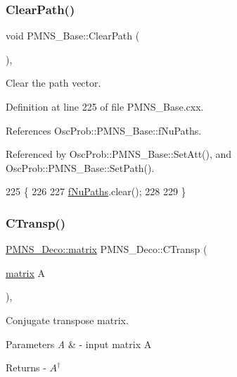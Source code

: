 \subsubsection{\texorpdfstring{Clear\+Path()}{ClearPath()}}
{\footnotesize\ttfamily void P\+M\+N\+S\+\_\+\+Base\+::\+Clear\+Path (\begin{DoxyParamCaption}{ }\end{DoxyParamCaption})\hspace{0.3cm}{\ttfamily [virtual]}, {\ttfamily [inherited]}}

Clear the path vector. 

Definition at line 225 of file P\+M\+N\+S\+\_\+\+Base.\+cxx.



References Osc\+Prob\+::\+P\+M\+N\+S\+\_\+\+Base\+::f\+Nu\+Paths.



Referenced by Osc\+Prob\+::\+P\+M\+N\+S\+\_\+\+Base\+::\+Set\+Att(), and Osc\+Prob\+::\+P\+M\+N\+S\+\_\+\+Base\+::\+Set\+Path().


\begin{DoxyCode}
225                          \{
226 
227   \hyperlink{classOscProb_1_1PMNS__Base_a69db9d57e12fc7cbe0431bc6c18fac93}{fNuPaths}.clear();
228 
229 \}
\end{DoxyCode}
\mbox{\label{classOscProb_1_1PMNS__Deco_aca391ff02be7abc2fd3dba40e9ce2665}} 
\subsubsection{\texorpdfstring{C\+Transp()}{CTransp()}}
{\footnotesize\ttfamily \hyperlink{classOscProb_1_1PMNS__Deco_a77b4e0c041b6268910a270be0f5387c9}{P\+M\+N\+S\+\_\+\+Deco\+::matrix} P\+M\+N\+S\+\_\+\+Deco\+::\+C\+Transp (\begin{DoxyParamCaption}\item[{\hyperlink{classOscProb_1_1PMNS__Deco_a77b4e0c041b6268910a270be0f5387c9}{matrix}}]{A }\end{DoxyParamCaption})\hspace{0.3cm}{\ttfamily [protected]}, {\ttfamily [virtual]}}

Conjugate transpose matrix.


\begin{DoxyParams}{Parameters}
{\em A} & -\/ input matrix A\\
\hline
\end{DoxyParams}
\begin{DoxyReturn}{Returns}
-\/ $A^{\dagger}$ 
\end{DoxyReturn}


